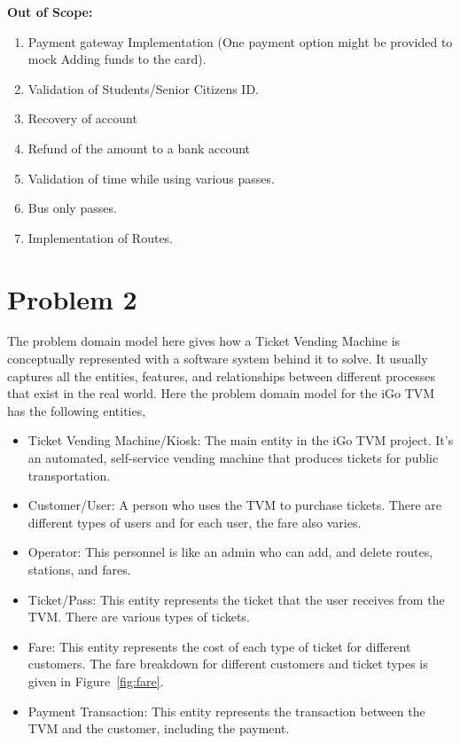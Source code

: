 \documentclass{article}
\begin{document}
\textbf{Out of Scope:}
\begin{enumerate}
 \item Payment gateway Implementation (One payment option might be provided to mock Adding funds to the card).
 \item Validation of Students/Senior Citizens ID. 
 \item Recovery of account 
 \item Refund of the amount to a bank account 
 \item Validation of time while using various passes.
 \item Bus only passes.
 \item Implementation of Routes. 
\end{enumerate}

\newpage

\section{Problem 2}
The problem domain model here gives how a Ticket Vending Machine is conceptually represented with a software system behind it to solve. It usually captures all the entities, features, and relationships between different processes that exist in the real world. Here the problem domain model for the iGo TVM has the following entities,  
\begin{itemize}
\item Ticket Vending Machine/Kiosk: The main entity in the iGo TVM project. It's an automated, self-service vending machine that produces tickets for public transportation. 
\item Customer/User: A person who uses the TVM to purchase tickets. There are different types of users and for each user, the fare also varies. 
\item Operator: This personnel is like an admin who can add, and delete routes, stations, and fares.
\item Ticket/Pass: This entity represents the ticket that the user receives from the TVM. There are various types of tickets.  
\item Fare: This entity represents the cost of each type of ticket for different customers. The fare breakdown for different customers and ticket types is given in Figure~\ref{fig:fare}. 
\item Payment Transaction: This entity represents the transaction between the TVM and the customer, including the payment. 
\end{itemize}
\end{document}
